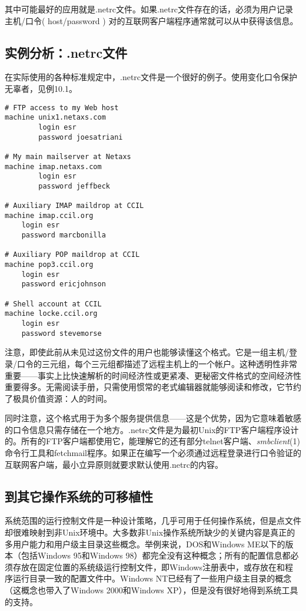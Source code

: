 \documentclass[12pt,oneside]{book}
\begin{document}
\begin{common-format}
其中可能最好的应用就是.netrc文件。如果.netrc文件存在的话，必须为用户记录主机/口令( host/password ) 对的互联网客户端程序通常就可以从中获得该信息。


\subsection{实例分析：.netrc文件}
在实际使用的各种标准规定中，.netrc文件是一个很好的例子。使用变化口令保护无辜者，见例10.1。
\begin{Verbatim}[label=例10.1 .netrc例子]
# FTP access to my Web host
machine unix1.netaxs.com
        login esr
        password joesatriani

# My main mailserver at Netaxs
machine imap.netaxs.com
        login esr
        password jeffbeck

# Auxiliary IMAP maildrop at CCIL
machine imap.ccil.org
    login esr
    password marcbonilla

# Auxiliary POP maildrop at CCIL
machine pop3.ccil.org
    login esr
    password ericjohnson

# Shell account at CCIL
machine locke.ccil.org
    login esr
    password stevemorse
\end{Verbatim}

注意，即使此前从未见过这份文件的用户也能够读懂这个格式。它是一组主机/登录/口令的三元组，每个三元组都描述了远程主机上的一个帐户。这种透明性非常重要——事实上比快速解析的时间经济性或更紧凑、更秘密文件格式的空间经济性重要得多。无需阅读手册，只需使用惯常的老式编辑器就能够阅读和修改，它节约了极具价值资源：人的时间。

同时注意，这个格式用于为多个服务提供信息——这是个优势，因为它意味着敏感的口令信息只需存储在一个地方。.netrc文件是为最初Unix的FTP客户端程序设计的。所有的FTP客户端都使用它，能理解它的还有部分telnet客户端、\textit{smbclient}(1)命令行工具和fetchmail程序。如果正在编写一个必须通过远程登录进行口令验证的互联网客户端，最小立异原则就要求默认使用.netrc的内容。


\subsection{到其它操作系统的可移植性}
系统范围的运行控制文件是一种设计策略，几乎可用于任何操作系统，但是点文件却很难映射到非Unix环境中。大多数非Unix操作系统所缺少的关键内容是真正的多用户能力和用户级主目录这些概念。举例来说，DOS和Windows ME以下的版本（包括Windows 95和Windows 98）都完全没有这种概念；所有的配置信息都必须存放在固定位置的系统级运行控制文件，即Windows注册表中，或存放在和程序运行目录一致的配置文件中。Windows NT已经有了一些用户级主目录的概念（这概念也带入了Windows 2000和Windows XP），但是没有很好地得到系统工具的支持。



\end{common-format}
\end{document}
